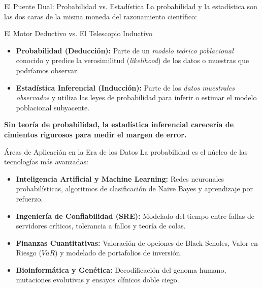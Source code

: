 \documentclass[10pt,aspectratio=169]{beamer}
\begin{document}
\begin{frame}{El Puente Dual: Probabilidad vs. Estadística}
  La probabilidad y la estadística son las dos caras de la misma moneda del razonamiento científico:
  
  \vspace{0.2em}
  \begin{block}{El Motor Deductivo vs. El Telescopio Inductivo}
    \begin{itemize}
      \item \textbf{Probabilidad (Deducción):} Parte de un \emph{modelo teórico poblacional} conocido y predice la verosimilitud (\emph{likelihood}) de los datos o muestras que podríamos observar. \pause
      \item \textbf{Estadística Inferencial (Inducción):} Parte de los \emph{datos muestrales observados} y utiliza las leyes de probabilidad para inferir o estimar el modelo poblacional subyacente.
    \end{itemize}
  \end{block}
  
  \vspace{0.2em}
  \pause
  \begin{center}
    \small \textbf{Sin teoría de probabilidad, la estadística inferencial carecería de cimientos rigurosos para medir el margen de error.}
  \end{center}
\end{frame}

\begin{frame}{Áreas de Aplicación en la Era de los Datos}
  La probabilidad es el núcleo de las tecnologías más avanzadas:
  \vspace{0.4em}
  \begin{itemize}
    \item \textbf{Inteligencia Artificial y Machine Learning:} Redes neuronales probabilísticas, algoritmos de clasificación de Naive Bayes y aprendizaje por refuerzo. \pause
    \item \textbf{Ingeniería de Confiabilidad (SRE):} Modelado del tiempo entre fallas de servidores críticos, tolerancia a fallos y teoría de colas. \pause
    \item \textbf{Finanzas Cuantitativas:} Valoración de opciones de Black-Scholes, Valor en Riesgo ($VaR$) y modelado de portafolios de inversión. \pause
    \item \textbf{Bioinformática y Genética:} Decodificación del genoma humano, mutaciones evolutivas y ensayos clínicos doble ciego.
  \end{itemize}
\end{frame}
\end{document}
